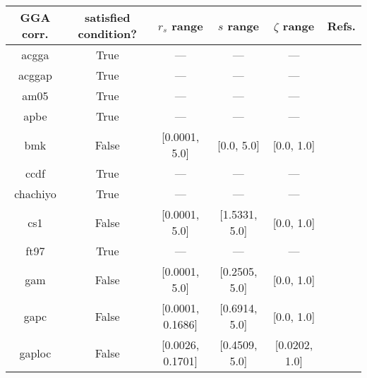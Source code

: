 \begin{tabular}{|c|c|c|c|c|l|}
\hline
     GGA corr. &  satisfied condition? &      $r_s$ range &        $s$ range & $\zeta$ range  &                                                          Refs. \\ \hline
         acgga &                  True &              --- &              --- &            --- &                        \cite{Cancio2018_084116,Burke2014_4834} \\ \hline
        acggap &                  True &              --- &              --- &            --- &                        \cite{Cancio2018_084116,Burke2014_4834} \\ \hline
          am05 &                  True &              --- &              --- &            --- &                 \cite{Armiento2005_085108,Mattsson2008_084714} \\ \hline
          apbe &                  True &              --- &              --- &            --- &                                   \cite{Constantin2011_186406} \\ \hline
           bmk &                 False &    [0.0001, 5.0] &       [0.0, 5.0] &     [0.0, 1.0] &                                          \cite{Boese2004_3405} \\ \hline
          ccdf &                  True &              --- &              --- &            --- &                                      \cite{Margraf2019_244116} \\ \hline
      chachiyo &                  True &              --- &              --- &            --- &                                     \cite{Chachiyo2020_112669} \\ \hline
           cs1 &                 False &    [0.0001, 5.0] &    [1.5331, 5.0] &     [0.0, 1.0] &                          \cite{Handy2002_5411,Proynov2006_436} \\ \hline
          ft97 &                  True &              --- &              --- &            --- &                         \cite{Filatov1997_603,Filatov1997_847} \\ \hline
           gam &                 False &    [0.0001, 5.0] &    [0.2505, 5.0] &     [0.0, 1.0] &                                            \cite{Yu2015_12146} \\ \hline
          gapc &                 False & [0.0001, 0.1686] &    [0.6914, 5.0] &     [0.0, 1.0] &                                        \cite{Fabiano2014_2016} \\ \hline
        gaploc &                 False & [0.0026, 0.1701] &    [0.4509, 5.0] &  [0.0202, 1.0] &                                        \cite{Fabiano2014_2016} \\ \hline

\end{tabular}
